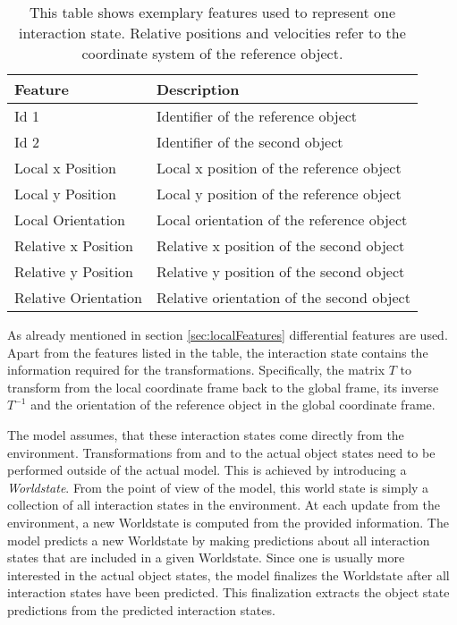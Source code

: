 \begin{table}
	\centering
	\begin{tabular*}{\textwidth}{@{\extracolsep{\fill} } l l}
		\textbf{Feature} & \textbf{Description} \\ 
		\hline \hline 
		 Id 1 & Identifier of the reference object \\ 
		 Id 2 & Identifier of the second object \\ 
		 Local x Position & Local x position of the reference object \\
		 Local y Position & Local y position of the reference object \\
		 Local Orientation & Local orientation of the reference object \\
		 Relative x Position & Relative x position of the second object \\
		 Relative y Position & Relative y position of the second object \\
		 Relative Orientation & Relative orientation of the second object \\
		\hline 
	\end{tabular*} 
	\caption{This table shows exemplary features used to represent one interaction state. Relative positions and velocities refer to the coordinate system of the reference object.}
	\label{tab:pairInteractionFeatures}
\end{table}

As already mentioned in section \ref{sec:localFeatures} differential features are used. Apart from the features listed in the table, the interaction state contains the information required for the transformations. Specifically, the matrix $T$ to transform from the local coordinate frame back to the global 
frame, its inverse $T^{-1}$ and the orientation of the reference object in the global coordinate frame.

The model assumes, that these interaction states come directly from the environment. Transformations from and to the actual object states need to be performed outside of the actual model. This is achieved by introducing a \textit{Worldstate}. From the point of view of the model, this world state is simply a collection of all interaction states in the environment. At each update from the environment, a new Worldstate is computed from the provided information. The model predicts a new Worldstate by making predictions about all interaction states that are included in a given Worldstate. Since one is usually more interested in the actual object states, the model finalizes the Worldstate after all interaction states have been predicted. This finalization extracts the object state predictions from the predicted interaction states. 

